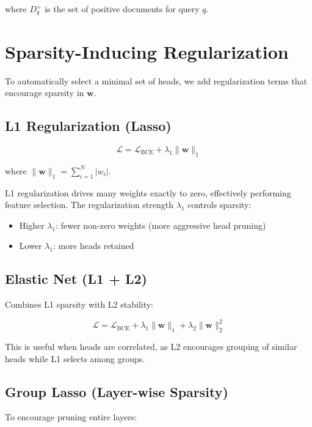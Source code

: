 \documentclass[11pt,a4paper]{article}
\begin{document}
where $D^+_q$ is the set of positive documents for query $q$.

\section{Sparsity-Inducing Regularization}

To automatically select a minimal set of heads, we add regularization terms that encourage sparsity in $\mathbf{w}$.

\subsection{L1 Regularization (Lasso)}

\begin{equation}
    \mathcal{L} = \mathcal{L}_{\text{BCE}} + \lambda_1 \|\mathbf{w}\|_1
\end{equation}

where $\|\mathbf{w}\|_1 = \sum_{i=1}^{N} |w_i|$.

L1 regularization drives many weights exactly to zero, effectively performing feature selection. The regularization strength $\lambda_1$ controls sparsity:
\begin{itemize}
    \item Higher $\lambda_1$: fewer non-zero weights (more aggressive head pruning)
    \item Lower $\lambda_1$: more heads retained
\end{itemize}

\subsection{Elastic Net (L1 + L2)}

Combines L1 sparsity with L2 stability:

\begin{equation}
    \mathcal{L} = \mathcal{L}_{\text{BCE}} + \lambda_1 \|\mathbf{w}\|_1 + \lambda_2 \|\mathbf{w}\|_2^2
\end{equation}

This is useful when heads are correlated, as L2 encourages grouping of similar heads while L1 selects among groups.

\subsection{Group Lasso (Layer-wise Sparsity)}

To encourage pruning entire layers:
\end{document}
